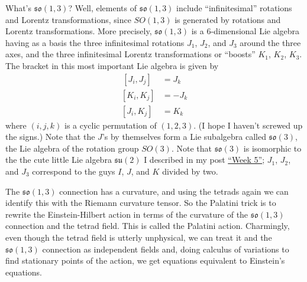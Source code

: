 \documentclass{article}
\begin{document}
What's \(\mathfrak{so}(1,3)\)? Well, elements of \(\mathfrak{so}(1,3)\)
include ``infinitesimal'' rotations and Lorentz transformations, since
\(SO(1,3)\) is generated by rotations and Lorentz transformations. More
precisely, \(\mathfrak{so}(1,3)\) is a 6-dimensional Lie algebra having
as a basis the three infinitesimal rotations \(J_1\), \(J_2\), and
\(J_3\) around the three axes, and the three infinitesimal Lorentz
transformations or ``boosts'' \(K_1\), \(K_2\), \(K_3\). The bracket in
this most important Lie algebra is given by
\[\begin{aligned}\,[J_i,J_j] & = J_k \\ [K_i,K_j] &= -J_k \\ [J_i,K_j] &= K_k\end{aligned}\]
where \((i,j,k)\) is a cyclic permutation of \((1,2,3)\). (I hope I
haven't screwed up the signs.) Note that the \(J\)'s by themselves form
a Lie subalgebra called \(\mathfrak{so}(3)\), the Lie algebra of the
rotation group \(SO(3)\). Note that \(\mathfrak{so}(3)\) is isomorphic
to the the cute little Lie algebra \(\mathfrak{su}(2)\) I described in
my post \protect\hyperlink{week5}{``Week 5''}; \(J_1\), \(J_2\), and
\(J_3\) correspond to the guys \(I\), \(J\), and \(K\) divided by two.

The \(\mathfrak{so}(1,3)\) connection has a curvature, and using the
tetrads again we can identify this with the Riemann curvature tensor. So
the Palatini trick is to rewrite the Einstein-Hilbert action in terms of
the curvature of the \(\mathfrak{so}(1,3)\) connection and the tetrad
field. This is called the Palatini action. Charmingly, even though the
tetrad field is utterly unphysical, we can treat it and the
\(\mathfrak{so}(1,3)\) connection as independent fields and, doing
calculus of variations to find stationary points of the action, we get
equations equivalent to Einstein's equations.
\end{document}
